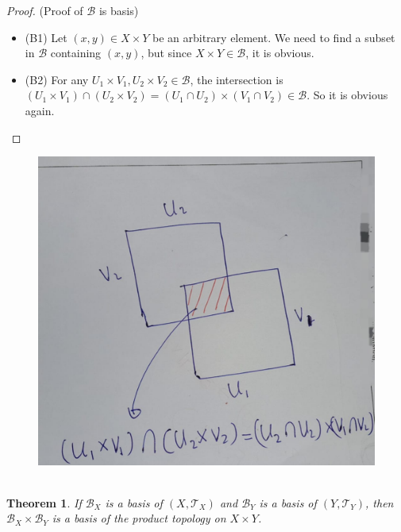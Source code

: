 \documentclass[
]{book}
\newtheorem{theorem}{Theorem}[chapter]
\theoremstyle{definition}
\theoremstyle{definition}
\theoremstyle{definition}
\theoremstyle{definition}
\theoremstyle{remark}
\begin{document}
\begin{proof}

(Proof of \(\mathcal{B}\) is basis)

\begin{itemize}
\item
  (B1) Let \((x, y) \in X \times Y\) be an arbitrary element. We need to find a subset in \(\mathcal{B}\) containing \((x, y)\), but since \(X \times Y \in \mathcal{B}\), it is obvious.
\item
  (B2) For any \(U_{1} \times V_{1}, U_{2} \times V_{2} \in \mathcal{B}\), the intersection is \(\left(U_{1} \times V_{1}\right) \cap\left(U_{2} \times V_{2}\right)=\left(U_{1} \cap U_{2}\right) \times\left(V_{1} \cap V_{2}\right) \in \mathcal{B}\). So it is obvious again.
\end{itemize}

\end{proof}

\begin{figure}
\centering
\includegraphics{figures/figure 09.jpg}
\caption{\label{fig:fig09}\(~\)}
\end{figure}

\begin{theorem}
\protect\hypertarget{thm:unnamed-chunk-36}{}\label{thm:unnamed-chunk-36}If \(\mathcal{B}_X\) is a basis of \((X, \mathcal{T}_X)\) and \(\mathcal{B}_Y\) is a basis of \((Y, \mathcal{T}_Y)\), then \(\mathcal{B}_X \times \mathcal{B}_Y\) is a basis of the product topology on \(X \times Y\).
\end{theorem}
\end{document}

